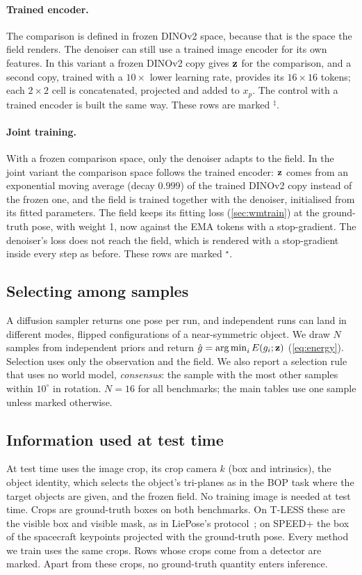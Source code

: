 \paragraph{Trained encoder.}
The comparison is defined in frozen DINOv2 space, because that is the space the field renders. The denoiser can still use a trained
image encoder for its own features. In this variant a frozen DINOv2 copy gives $\mathbf{z}$ for the comparison, and a second copy, trained
with a $10\times$ lower learning rate, provides its $16\times16$ tokens; each $2\times2$ cell is concatenated, projected and added to $x_p$.
The control with a trained encoder is built the same way. These rows are marked $^\ddagger$.

\paragraph{Joint training.}
With a frozen comparison space, only the denoiser adapts to the field. In the joint variant the comparison space follows the trained
encoder: $\mathbf{z}$ comes from an exponential moving average (decay $0.999$) of the trained DINOv2 copy instead of the frozen one, and the
field is trained together with the denoiser, initialised from its fitted parameters. The field keeps its fitting loss
(\cref{sec:wmtrain}) at the ground-truth pose, with weight 1, now against the EMA tokens with a stop-gradient. The denoiser's loss
does not reach the field, which is rendered with a stop-gradient inside every step as before. These rows are marked $^\star$.

\subsection{Selecting among samples}
\label{sec:select}
A diffusion sampler returns one pose per run, and independent runs can land in different modes, \eg flipped configurations of a
near-symmetric object. We draw $N$ samples from independent priors and return $\hat g=\operatorname*{arg\,min}_{i} E(g_i;\mathbf{z})$
(\cref{eq:energy}). Selection uses only the observation and the field. We also report a selection rule that uses no world model,
\emph{consensus}: the sample with the most other samples within $10^\circ$ in rotation. $N=16$ for all benchmarks; the main tables use one
sample unless marked otherwise.

\subsection{Information used at test time}
\label{sec:protocol}
At test time \method uses the image crop, its crop camera $k$ (box and intrinsics), the object identity, which selects the object's
tri-planes as in the BOP task where the target objects are given, and the frozen field. No training image is needed at test time.
Crops are ground-truth boxes on both benchmarks. On T-LESS these are the visible box and visible mask, as in LiePose's
protocol~\cite{hsiao2024liepose}; on SPEED+ the box of the spacecraft keypoints projected with the ground-truth pose. Every method we
train uses the same crops. Rows whose crops come from a detector are marked. Apart from these crops, no ground-truth quantity enters
inference.
